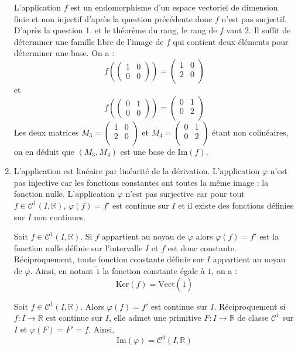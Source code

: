 \documentclass[a4paper,10pt]{report}
\begin{document}
\begin{enumerate}
\noindent L'application $f$ est un endomorphisme d'un espace vectoriel de dimension finie et non injectif d'après la question précédente donc $f$ n'est pas surjectif. D'après la question 1. et le théorème du rang, le rang de $f$ vaut $2$. Il suffit de déterminer une famille libre de l'image de $f$ qui contient deux éléments pour déterminer une base. On a :
$$  f \left( \begin{pmatrix}
1 & 0 \\
0 & 0
\end{pmatrix} \right) = \begin{pmatrix}
1 & 0 \\
2 & 0 \\
\end{pmatrix}$$
et 
$$  f \left( \begin{pmatrix}
0 & 1 \\
0 & 0
\end{pmatrix} \right) = \begin{pmatrix}
0 & 1 \\
0 & 2 \\
\end{pmatrix}$$
Les deux matrices $M_3=\begin{pmatrix}
1 & 0 \\
2 & 0 \\
\end{pmatrix}$ et $M_4=\begin{pmatrix}
0 & 1 \\
0 & 2 \\
\end{pmatrix}$ étant non colinéaires, on en déduit que $(M_3,M_4)$ est une base de $\textrm{Im}(f)$.
\item L'application est linéaire par linéarité de la dérivation. L'application $\varphi$ n'est pas injective car les fonctions constantes ont toutes la même image : la fonction nulle. L'application $\varphi$ n'est pas surjective car pour tout $f \in \mathcal{C}^1(I, \mathbb{R})$, $\varphi(f)=f'$ est continue sur $I$ et il existe des fonctions définies sur $I$ non continues.
\medskip

\noindent Soit $f \in \mathcal{C}^1(I, \mathbb{R})$. Si $f$ appartient au noyau de $\varphi$ alors $\varphi(f)=f'$ est la fonction nulle définie sur l'intervalle $I$ et $f$ est donc constante. Réciproquement, toute fonction constante définie sur $I$ appartient au noyau de $\varphi$. Ainsi, en notant $\tilde{1}$ la fonction constante égale à $1$, on a :
$$ \textrm{Ker}(f) = \textrm{Vect}( \tilde{1} )$$
\medskip

\noindent Soit $f \in \mathcal{C}^1(I, \mathbb{R})$. Alors $\varphi(f) = f'$ est continue sur $I$. Réciproquement si $f : I \rightarrow \mathbb{R}$ est continue sur $I$, elle admet une primitive $F : I \rightarrow \mathbb{R}$ de classe $\mathcal{C}^1$ sur $I$ et $\varphi(F)=F'=f$. Ainsi, 
$$  \textrm{Im}(\varphi) = \mathcal{C}^0(I, \mathbb{R})$$
\end{enumerate}
\end{document}
